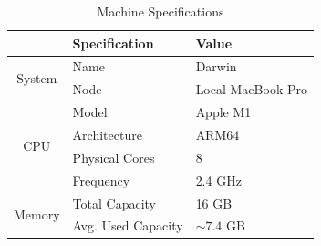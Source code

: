 \documentclass[a4paper]{article}
\begin{document}
  \begin{table}[ht]
    \centering
    \begin{tabular}{cll}
     \toprule
     & Specification & Value \\
     \midrule

     \multirow{2}{*}{System} & Name & Darwin \\
     \vspace{0.1cm}
     & Node & Local MacBook Pro \\

     \multirow{4}{*}{CPU} & Model & Apple M1 \\
     & Architecture & ARM64 \\
     & Physical Cores & 8 \\
     \vspace{0.1cm}
     & Frequency & 2.4 GHz \\

     \multirow{2}{*}{Memory} & Total Capacity & 16 GB \\
     & Avg. Used Capacity & $\sim 7.4$ GB \\

     \bottomrule
    \end{tabular}
    \caption{Machine Specifications}
    \label{tab:machine-specs}
  \end{table}
  

\end{document}
